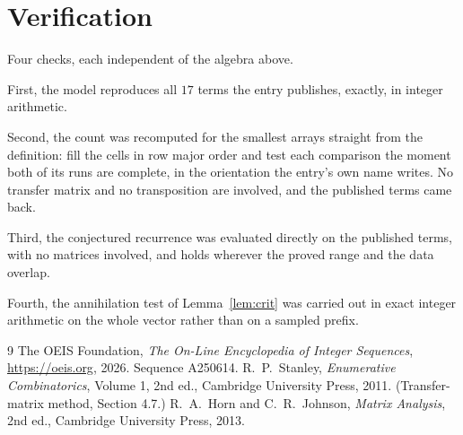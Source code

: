 \documentclass[11pt,a4paper]{article}
\theoremstyle{plain}
\theoremstyle{definition}
\begin{document}
\section{Verification}

Four checks, each independent of the algebra above.

First, the model reproduces all $17$ terms the entry publishes, exactly, in integer
arithmetic.

Second, the count was recomputed for the smallest arrays straight from the definition: fill the
cells in row major order and test each comparison the moment both of its runs are complete,
in the orientation the entry's own name writes. No transfer matrix and no transposition are
involved, and the published terms came back.

Third, the conjectured recurrence was evaluated directly on the published terms, with no
matrices involved, and holds wherever the proved range and the data overlap.

Fourth, the annihilation test of Lemma~\ref{lem:crit} was carried out in exact integer
arithmetic on the whole vector rather than on a sampled prefix.

\begin{thebibliography}{9}
 The OEIS Foundation, \emph{The On-Line Encyclopedia of Integer
Sequences}, \url{https://oeis.org}, 2026. Sequence A250614.
 R.~P.~Stanley, \emph{Enumerative Combinatorics}, Volume 1, 2nd ed.,
Cambridge University Press, 2011. (Transfer-matrix method, Section 4.7.)
 R.~A.~Horn and C.~R.~Johnson, \emph{Matrix Analysis}, 2nd ed., Cambridge
University Press, 2013.
\end{thebibliography}
\end{document}
